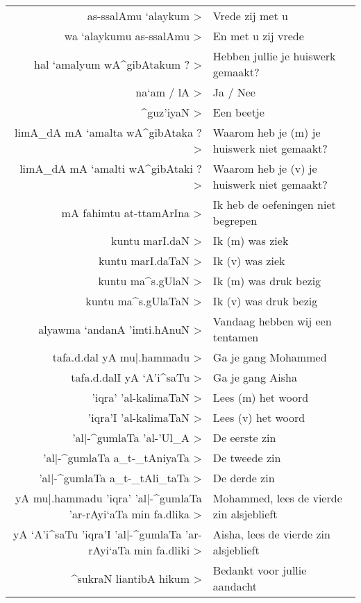 \documentclass[a4paper]{article}
\begin{document}
\setarab \fullvocalize

\begin{center}
\begin{tabular}{rl}
\< as-ssalAmu `alaykum >
& Vrede zij met u
\\
\< wa `alaykumu as-ssalAmu >
& En met u zij vrede
\\
\< hal `amalyum wA^gibAtakum ? >
& Hebben jullie je huiswerk gemaakt?
\\
\< na`am / lA >
& Ja / Nee
\\
\< ^guz'iyaN >
& Een beetje
\\
\< limA_dA mA `amalta wA^gibAtaka ? >
& Waarom heb je (m) je huiswerk niet gemaakt?
\\
\< limA_dA mA `amalti wA^gibAtaki ? >
& Waarom heb je (v) je huiswerk niet gemaakt?
\\
\< mA fahimtu at-ttamArIna >
& Ik heb de oefeningen niet begrepen
\\
\< kuntu marI.daN >
& Ik (m) was ziek
\\
\< kuntu marI.daTaN >
& Ik (v) was ziek
\\
\< kuntu ma^s.gUlaN >
& Ik (m) was druk bezig
\\
\< kuntu ma^s.gUlaTaN >
& Ik (v) was druk bezig
\\
\< alyawma `andanA 'imti.hAnuN >
& Vandaag hebben wij een tentamen
\\
\< tafa.d.dal yA  mu|.hammadu >
& Ga je gang Mohammed
\\
\< tafa.d.dalI yA  `A'i^saTu >
& Ga je gang Aisha
\\
\< 'iqra' 'al-kalimaTaN >
& Lees (m) het woord
\\
\< 'iqra'I 'al-kalimaTaN >
& Lees (v) het woord
\\
\< 'al|-^gumlaTa 'al-'Ul_A >
& De eerste zin
\\
\< 'al|-^gumlaTa a_t-_tAniyaTa >
& De tweede zin
\\
\< 'al|-^gumlaTa a_t-_tAli_taTa >
& De derde zin
\\
\< yA mu|.hammadu 'iqra' 'al|-^gumlaTa 'ar-rAyi`aTa min fa.dlika >
& Mohammed, lees de vierde zin alsjeblieft
\\
\< yA `A'i^saTu 'iqra'I 'al|-^gumlaTa 'ar-rAyi`aTa min fa.dliki >
& Aisha, lees de vierde zin alsjeblieft
\\
\< ^sukraN liantibA hikum >
& Bedankt voor jullie aandacht
\end{tabular}
\end{center}
\end{document}
